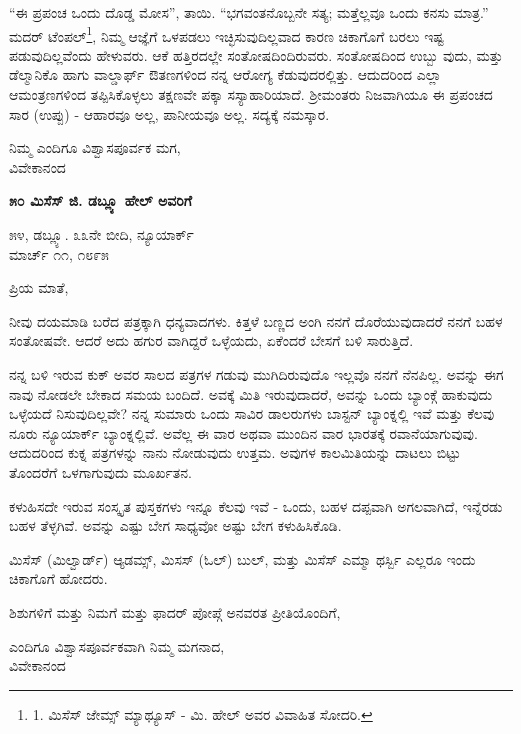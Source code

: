 “ಈ ಪ್ರಪಂಚ ಒಂದು ದೊಡ್ಡ ಮೋಸ”, ತಾಯಿ. “ಭಗವಂತನೊಬ್ಬನೇ ಸತ್ಯ; ಮತ್ತೆಲ್ಲವೂ ಒಂದು ಕನಸು ಮಾತ್ರ.” ಮದರ್ ಟೆಂಪಲ್\footnote{1. ಮಿಸೆಸ್ ಜೇಮ್ಸ್ ಮ್ಯಾಥ್ಯೂಸ್ - ಮಿ. ಹೇಲ್ ಅವರ ವಿವಾಹಿತ ಸೋದರಿ.}, ನಿಮ್ಮ ಆಜ್ಞೆಗೆ ಒಳಪಡಲು ಇಚ್ಛಿಸುವುದಿಲ್ಲವಾದ ಕಾರಣ ಚಿಕಾಗೊಗೆ ಬರಲು ಇಷ್ಟ ಪಡುವುದಿಲ್ಲವೆಂದು ಹೇಳುವರು. ಆಕೆ ಹತ್ತಿರದಲ್ಲೇ ಸಂತೋಷದಿಂದಿರುವರು. ಸಂತೋಷದಿಂದ ಉಬ್ಬು ವುದು, ಮತ್ತು ಡೆಲ್ಮಾನಿಕೊ ಹಾಗು ವಾಲ್ಡಾರ್ಫ್ ಔತಣಗಳಿಂದ ನನ್ನ ಆರೋಗ್ಯ ಕೆಡುವುದರಲ್ಲಿತ್ತು. ಆದುದರಿಂದ ಎಲ್ಲಾ ಆಮಂತ್ರಣಗಳಿಂದ ತಪ್ಪಿಸಿಕೊಳ್ಳಲು ತಕ್ಷಣವೇ ಪಕ್ಕಾ ಸಸ್ಯಾಹಾರಿಯಾದೆ. ಶ‍್ರೀಮಂತರು ನಿಜವಾಗಿಯೂ ಈ ಪ್ರಪಂಚದ ಸಾರ (ಉಪ್ಪು) - ಆಹಾರವೂ ಅಲ್ಲ, ಪಾನೀಯವೂ ಅಲ್ಲ. ಸದ್ಯಕ್ಕೆ ನಮಸ್ಕಾರ.

\begin{flushright}
ನಿಮ್ಮ ಎಂದಿಗೂ ವಿಶ್ವಾಸಪೂರ್ವಕ ಮಗ,\\ವಿವೇಕಾನಂದ
\end{flushright}

\begin{center}
\textbf{೫೦ ಮಿಸೆಸ್ ಜಿ. ಡಬ್ಲ್ಯೂ ಹೇಲ್ ಅವರಿಗೆ}
\end{center}

\begin{flushright}
೫೪, ಡಬ್ಲ್ಯೂ. ೩೩ನೇ ಬೀದಿ, ನ್ಯೂಯಾರ್ಕ್\\ಮಾರ್ಚ್ ೧೧, ೧೮೯೫
\end{flushright}

ಪ್ರಿಯ ಮಾತೆ,

ನೀವು ದಯಮಾಡಿ ಬರೆದ ಪತ್ರಕ್ಕಾಗಿ ಧನ್ಯವಾದಗಳು. ಕಿತ್ತಳೆ ಬಣ್ಣದ ಅಂಗಿ ನನಗೆ ದೊರೆಯುವುದಾದರೆ ನನಗೆ ಬಹಳ ಸಂತೋಷವೇ. ಆದರೆ ಅದು ಹಗುರ ವಾಗಿದ್ದರೆ ಒಳ್ಳೆಯದು, ಏಕೆಂದರೆ ಬೇಸಗೆ ಬಳಿ ಸಾರುತ್ತಿದೆ.

ನನ್ನ ಬಳಿ ಇರುವ ಕುಕ್ ಅವರ ಸಾಲದ ಪತ್ರಗಳ ಗಡುವು ಮುಗಿದಿರುವುದೊ ಇಲ್ಲವೊ ನನಗೆ ನೆನಪಿಲ್ಲ. ಅವನ್ನು ಈಗ ನಾವು ನೋಡಲೇ ಬೇಕಾದ ಸಮಯ ಬಂದಿದೆ. ಅವಕ್ಕೆ ಮಿತಿ ಇರುವುದಾದರೆ, ಅವನ್ನು ಒಂದು ಬ್ಯಾಂಕ್ಗೆ ಹಾಕುವುದು ಒಳ್ಳೆಯದೆ ನಿಸುವುದಿಲ್ಲವೇ? ನನ್ನ ಸುಮಾರು ಒಂದು ಸಾವಿರ ಡಾಲರುಗಳು ಬಾಸ್ಟನ್ ಬ್ಯಾಂಕ್ನಲ್ಲಿ ಇವೆ ಮತ್ತು ಕೆಲವು ನೂರು ನ್ಯೂಯಾರ್ಕ್ ಬ್ಯಾಂಕ್ನಲ್ಲಿವೆ. ಅವೆಲ್ಲ ಈ ವಾರ ಅಥವಾ ಮುಂದಿನ ವಾರ ಭಾರತಕ್ಕೆ ರವಾನೆಯಾಗುವುವು. ಆದುದರಿಂದ ಕುಕ್ನ ಪತ್ರಗಳನ್ನು ನಾನು ನೋಡುವುದು ಉತ್ತಮ. ಅವುಗಳ ಕಾಲಮಿತಿಯನ್ನು ದಾಟಲು ಬಿಟ್ಟು ತೊಂದರೆಗೆ ಒಳಗಾಗುವುದು ಮೂರ್ಖತನ.

ಕಳುಹಿಸದೇ ಇರುವ ಸಂಸ್ಕೃತ ಪುಸ್ತಕಗಳು ಇನ್ನೂ ಕೆಲವು ಇವೆ - ಒಂದು, ಬಹಳ ದಪ್ಪವಾಗಿ ಅಗಲವಾಗಿದೆ, ಇನ್ನೆರಡು ಬಹಳ ತೆಳ್ಳಗಿವೆ. ಅವನ್ನು ಎಷ್ಟು ಬೇಗ ಸಾಧ್ಯವೋ ಅಷ್ಟು ಬೇಗ ಕಳುಹಿಸಿಕೊಡಿ.

ಮಿಸೆಸ್ (ಮಿಲ್ವಾರ್ಡ್) ಆ್ಯಡಮ್ಸ್, ಮಿಸಸ್ (ಓಲ್) ಬುಲ್, ಮತ್ತು ಮಿಸೆಸ್ ಎಮ್ಮಾ ಥರ್ಸ್ಬಿ ಎಲ್ಲರೂ ಇಂದು ಚಿಕಾಗೊಗೆ ಹೋದರು.

ಶಿಶುಗಳಿಗೆ ಮತ್ತು ನಿಮಗೆ ಮತ್ತು ಫಾದರ್ ಪೋಪ್ಗೆ ಅನವರತ ಪ್ರೀತಿಯೊಂದಿಗೆ,

\begin{flushright}
ಎಂದಿಗೂ ವಿಶ್ವಾಸಪೂರ್ವಕವಾಗಿ ನಿಮ್ಮ ಮಗನಾದ,\\ವಿವೇಕಾನಂದ
\end{flushright}

